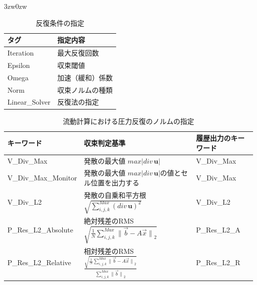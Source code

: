 \begin{indentation}{3zw}{0zw}
\begin{table}[htdp]
\caption{反復条件の指定}
\begin{center}
\small
\begin{tabular}{ll} \toprule
タグ & 指定内容\\ \midrule
Iteration & 最大反復回数\\
Epsilon & 収束閾値\\
Omega & 加速（緩和）係数\\
Norm & 収束ノルムの種類\\ 
Linear\_Solver & 反復法の指定\\ \bottomrule
\end{tabular}
\end{center}
\label{tbl:flow_itr}
\end{table}

\begin{table}[htdp]
\caption{流動計算における圧力反復のノルムの指定}
\begin{center}
\small
\begin{tabular}{lll} \toprule
キーワード & 収束判定基準 & 履歴出力のキーワード\\ \midrule
V\_Div\_Max & 発散の最大値 $max\left|div\,\bm{u}\right|$ & V\_Div\_Max\\
\vspace{2mm}
V\_Div\_Max\_Monitor & 発散の最大値 $max\left|div\,\bm{u}\right|$の値とセル位置を出力する\footnotemark[1] & V\_Div\_Max\\
\vspace{2mm}
V\_Div\_L2 & 発散の自乗和平方根 $\displaystyle \sqrt{ \sum_{i,j,k}^{Max}{{( {div\,\bm{u}} )}^2}}$ & V\_Div\_L2\\
\vspace{2mm}
P\_Res\_L2\_Absolute & 絶対残差のRMS $\displaystyle \sqrt{ \frac{1}{N} \sum_{i,j,k}^{Max} {\|\vec{b}- A \vec{x}\|}_{2} }$ & P\_Res\_L2\_A\\ 
P\_Res\_L2\_Relative & 相対残差のRMS $\displaystyle {\frac{ \sqrt{ \frac{1}{N} \sum_{i,j,k}^{Max}{\|\vec{b}- A \vec{x}\|}_{2}} } {\sum_{i,j,k}^{Max} {\|\vec{b}\|}_{2} }}$ & P\_Res\_L2\_R\\ \bottomrule
\end{tabular}
\end{center}
\label{tbl:norm-type}
\end{table}


\end{indentation}
